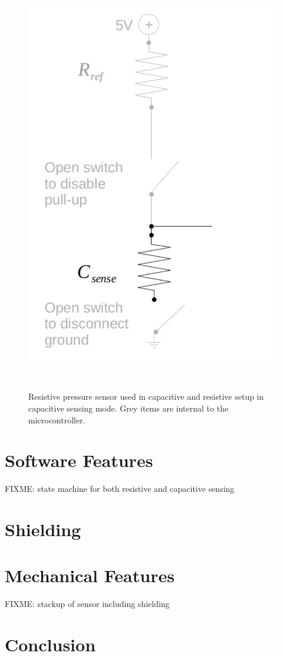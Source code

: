 \documentclass{sigchi}
\begin{document}
\begin{figure}
\centering
  \includegraphics[width=0.9\columnwidth]{figures/cap_res_setup_cap}
  \caption{Resistive pressure sensor used in capacitive and resistive setup in
capacitive sensing mode. Grey items are internal to the
microcontroller.}~\label{fig:cap_res_setup_cap}
\end{figure}

\section{Software Features}
FIXME: state machine for both resistive and capacitive sensing

\section{Shielding}

\section{Mechanical Features}
FIXME: stackup of sensor including shielding

\section{Conclusion}

\balance{}



\end{document}

